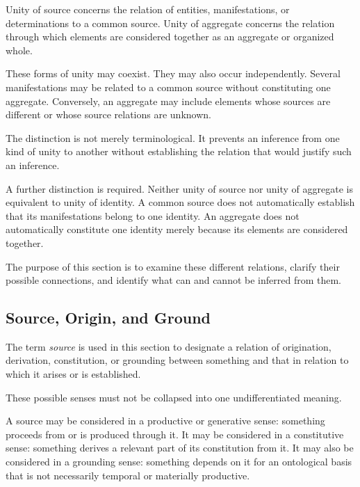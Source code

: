 Unity of source concerns the relation of entities,
manifestations, or determinations to a common source.
Unity of aggregate concerns the relation through
which elements are considered together as an aggregate
or organized whole.

These forms of unity may coexist. They may also occur
independently. Several manifestations may be related
to a common source without constituting one aggregate.
Conversely, an aggregate may include elements whose
sources are different or whose source relations
are unknown.

The distinction is not merely terminological. It
prevents an inference from one kind of unity to another
without establishing the relation that would justify
such an inference.

A further distinction is required. Neither unity of
source nor unity of aggregate is equivalent to unity
of identity. A common source does not automatically
establish that its manifestations belong to one
identity. An aggregate does not automatically
constitute one identity merely because its elements
are considered together.

The purpose of this section is to examine these
different relations, clarify their possible connections,
and identify what can and cannot be inferred from them.


\subsection{Source, Origin, and Ground}

The term \emph{source} is used in this section to
designate a relation of origination, derivation,
constitution, or grounding between something and
that in relation to which it arises or is established.

These possible senses must not be collapsed into
one undifferentiated meaning.

A source may be considered in a productive or
generative sense: something proceeds from or is
produced through it. It may be considered in a
constitutive sense: something derives a relevant
part of its constitution from it. It may also be
considered in a grounding sense: something depends
on it for an ontological basis that is not necessarily
temporal or materially productive.

